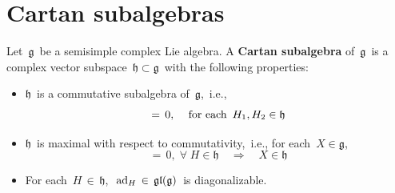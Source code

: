 \section{Cartan subalgebras}


\begin{definition}
\mbox{}
\vskip 0.05cm
\noindent
Let \,$\mathfrak{g}$\, be a semisimple complex Lie algebra.
A \textbf{Cartan subalgebra} of \,$\mathfrak{g}$\,
is a complex vector subspace \,$\mathfrak{h} \subset \mathfrak{g}$\,
with the following properties:
\begin{itemize}
\item
    $\mathfrak{h}$\, is a commutative subalgebra of \,$\mathfrak{g}$,\, i.e.,
    \begin{equation*}
    [\,H_{1}\,,\,H_{2}\,] \,=\, 0,\,
    \quad
    \textnormal{for each \,$H_{1}, H_{2} \in \mathfrak{h}$}
    \end{equation*}
\item
    $\mathfrak{h}$\, is maximal with respect to commutativity,\, i.e.,
    for each \,$X \in \mathfrak{g}$,\,
    \begin{equation*}
    [H,X] \,=\, 0, \;\forall\; H \in \mathfrak{h} 
    \quad\Longrightarrow\quad
    X \in \mathfrak{h}
    \end{equation*}
\item
    For each \,$H \,\in\, \mathfrak{h}$,\,
    \,$\textnormal{ad}_{H} \,\in\, \mathfrak{gl}(\mathfrak{g})$\,
    is diagonalizable.
\end{itemize}
\end{definition}


